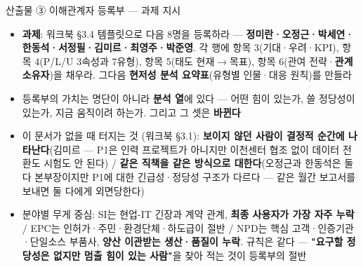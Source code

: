 \begin{frame}[allowframebreaks=1.0]{산출물 ③ 이해관계자 등록부 — 과제 지시}
\small
\begin{itemize}
\item\relax \textbf{과제}: 워크북 §3.4 템플릿으로 다음 8명을 등록하라 — \textbf{정미란·오정근·박세연·한동석·서정필·김미르·최영주·박준영}. 각 행에 항목 3(기대·우려·KPI), 항목 4(P/L/U 3속성과 7유형), 항목 5(태도 현재$\rightarrow$목표), 항목 6(관여 전략·\textbf{관계 소유자})을 채우라. 그다음 \textbf{현저성 분석 요약표}(유형별 인물·대응 원칙)를 만들라
\item\relax 등록부의 가치는 명단이 아니라 \textbf{분석 열}에 있다 — 어떤 힘이 있는가, 쓸 정당성이 있는가, 지금 움직이려 하는가. 그리고 그 셋은 \textbf{바뀐다}
\item\relax 이 문서가 없을 때 터지는 것 (워크북 §3.1): \textbf{보이지 않던 사람이 결정적 순간에 나타난다}(김미르 — P1은 인력 프로젝트가 아니지만 이천센터 협조 없이 데이터 전환도 시험도 안 된다) / \textbf{같은 직책을 같은 방식으로 대한다}(오정근과 한동석은 둘 다 본부장이지만 P1에 대한 긴급성·정당성 구조가 다르다 — 같은 월간 보고서를 보내면 둘 다에게 외면당한다)
\item\relax 분야별 무게 중심: SI는 현업-IT 긴장과 계약 관계, \textbf{최종 사용자가 가장 자주 누락} / EPC는 인허가·주민·환경단체·하도급이 절반 / NPD는 핵심 고객·인증기관·단일소스 부품사, \textbf{양산 이관받는 생산·품질이 누락}. 규칙은 같다 — \textbf{"요구할 정당성은 없지만 멈출 힘이 있는 사람"}을 찾아 적는 것이 등록부의 절반
\end{itemize}
\end{frame}


